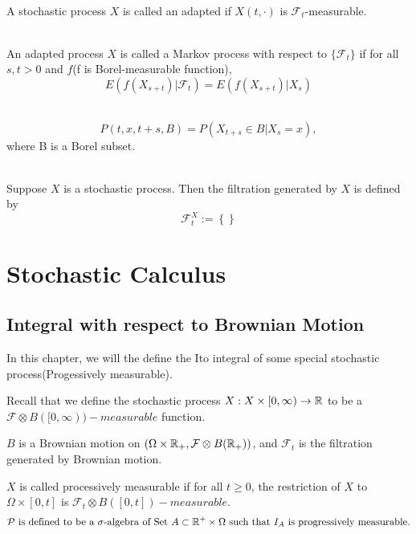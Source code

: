 \documentclass[12pt]{book}
\begin{document}
\begin{definition} \ \\
A stochastic process $X$ is called an adapted if $X(t,\cdot)$ is $\mathcal{F}_t$-measurable.
\end{definition}

\begin{definition} \ \\
An adapted process $X$ is called a Markov process with respect to $\{\mathcal{F}_t\}$ if for all $s,t>0$ and $f$(f is Borel-measurable function),
$$
E(f(X_{s+t})|\mathcal{F}_t) = E(f(X_{s+t})|X_s) 
$$
\end{definition}

\begin{definition} \ \\
$$
P(t,x,t+s,B) = P(X_{t+s}\in B|X_s=x),
$$
where B is a Borel subset.
\end{definition}

\begin{definition} \ \\
Suppose $X$ is a stochastic process. Then the filtration generated by $X$ is defined by
$$
\mathcal{F}_t^X:=\left\{ \right\}
$$

\end{definition}




\chapter{Stochastic Calculus}
\section{Integral with respect to Brownian Motion}
In this chapter, we will the define the Ito integral of some special stochastic process(Progessively measurable).

Recall that we define the stochastic process $X: X\times [0,\infty) \to \mathbb{R}$ to be a $\mathcal F \otimes B([0,\infty))-measurable$ function. 

$B$ is a Brownian motion on $(\Omega \times \mathbb{R}_+, \mathcal F \otimes B(\mathbb{R}_+))$, and $\mathcal{F}_t$ is the filtration generated by Brownian motion.
\begin{definition}
	$X$ is called processively measurable if for all $t\geq0$, the restriction of $X$ to $\Omega \times [0,t]$ is $\mathcal{F}_t \otimes B([0,t])-measurable$.
$$
\mathcal{P} \ \text{is defined to be a $\sigma$-algebra of Set $A \subset \mathbb{R}^+ \times \Omega$ such that $I_A$ is progressively measurable.}
$$

\end{definition}
\end{document}

